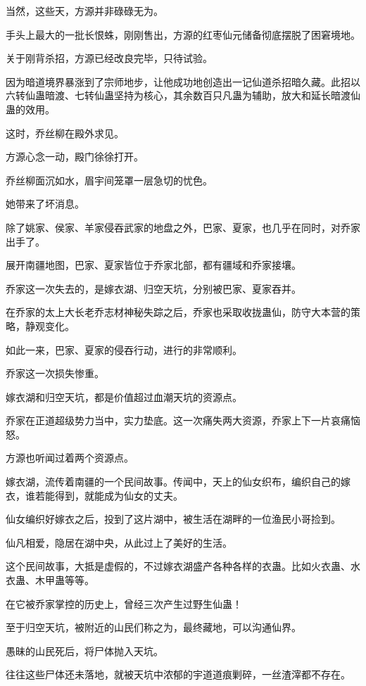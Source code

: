 
\begin{this_body}

当然，这些天，方源并非碌碌无为。

手头上最大的一批长恨蛛，刚刚售出，方源的红枣仙元储备彻底摆脱了困窘境地。

关于刚背杀招，方源已经改良完毕，只待试验。

因为暗道境界暴涨到了宗师地步，让他成功地创造出一记仙道杀招暗久藏。此招以六转仙蛊暗渡、七转仙蛊坚持为核心，其余数百只凡蛊为辅助，放大和延长暗渡仙蛊的效用。

这时，乔丝柳在殿外求见。

方源心念一动，殿门徐徐打开。

乔丝柳面沉如水，眉宇间笼罩一层急切的忧色。

她带来了坏消息。

除了姚家、侯家、羊家侵吞武家的地盘之外，巴家、夏家，也几乎在同时，对乔家出手了。

展开南疆地图，巴家、夏家皆位于乔家北部，都有疆域和乔家接壤。

乔家这一次失去的，是嫁衣湖、归空天坑，分别被巴家、夏家吞并。

在乔家的太上大长老乔志材神秘失踪之后，乔家也采取收拢蛊仙，防守大本营的策略，静观变化。

如此一来，巴家、夏家的侵吞行动，进行的非常顺利。

乔家这一次损失惨重。

嫁衣湖和归空天坑，都是价值超过血潮天坑的资源点。

乔家在正道超级势力当中，实力垫底。这一次痛失两大资源，乔家上下一片哀痛恼怒。

方源也听闻过着两个资源点。

嫁衣湖，流传着南疆的一个民间故事。传闻中，天上的仙女织布，编织自己的嫁衣，谁若能得到，就能成为仙女的丈夫。

仙女编织好嫁衣之后，投到了这片湖中，被生活在湖畔的一位渔民小哥捡到。

仙凡相爱，隐居在湖中央，从此过上了美好的生活。

这个民间故事，大抵是虚假的，不过嫁衣湖盛产各种各样的衣蛊。比如火衣蛊、水衣蛊、木甲蛊等等。

在它被乔家掌控的历史上，曾经三次产生过野生仙蛊！

至于归空天坑，被附近的山民们称之为，最终藏地，可以沟通仙界。

愚昧的山民死后，将尸体抛入天坑。

往往这些尸体还未落地，就被天坑中浓郁的宇道道痕剿碎，一丝渣滓都不存在。


\end{this_body}
